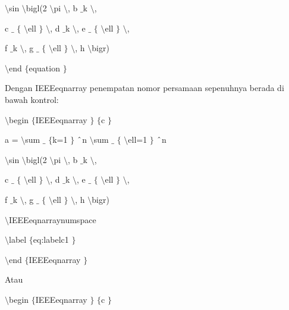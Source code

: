 \begin{itemize}
\vspace{12pt}
\noindent 
 $  \setminus  $sin  $  \setminus  $bigl(2 $  \setminus  $pi  $  \setminus  $, b $  \_  $k  $  \setminus  $, \par
\vspace{12pt}
\noindent 
c $  \_  $ $  \{  $ $  \setminus  $ell $  \}  $  $  \setminus  $, d $  \_  $k  $  \setminus  $, e $  \_  $ $  \{  $ $  \setminus  $ell $  \}  $  $  \setminus  $, \par
\vspace{12pt}
\noindent 
f $  \_  $k  $  \setminus  $, g $  \_  $ $  \{  $ $  \setminus  $ell $  \}  $  $  \setminus  $, h  $  \setminus  $bigr) \par
\vspace{12pt}
\noindent 
 $  \setminus  $end $  \{  $equation $  \}  $ \par
\vspace{12pt}
\noindent 
Dengan IEEEeqnarray penempatan nomor persamaan sepenuhnya berada di bawah kontrol: \par
\vspace{12pt}
\noindent 
 $  \setminus  $begin $  \{  $IEEEeqnarray $  \}  $ $  \{  $c $  \}  $ \par
\noindent 
a =  $  \setminus  $sum $  \_  $ $  \{  $k=1 $  \}  $ $  \string^  $n $  \setminus  $sum $  \_  $ $  \{  $ $  \setminus  $ell=1 $  \}  $ $  \string^  $n \par
\noindent 
 $  \setminus  $sin  $  \setminus  $bigl(2 $  \setminus  $pi  $  \setminus  $, b $  \_  $k  $  \setminus  $, \par
\noindent 
c $  \_  $ $  \{  $ $  \setminus  $ell $  \}  $  $  \setminus  $, d $  \_  $k  $  \setminus  $, e $  \_  $ $  \{  $ $  \setminus  $ell $  \}  $  $  \setminus  $, \par
\noindent 
f $  \_  $k  $  \setminus  $, g $  \_  $ $  \{  $ $  \setminus  $ell $  \}  $  $  \setminus  $, h  $  \setminus  $bigr) \par
\noindent 
 $  \setminus  $IEEEeqnarraynumspace \par
\noindent 
 $  \setminus  $label $  \{  $eq:labelc1 $  \}  $ \par
\noindent 
 $  \setminus  $end $  \{  $IEEEeqnarray $  \}  $ \par
\noindent 
\vspace{12pt}
\noindent 
\vspace{12pt}
\noindent 
Atau \par
\noindent 
\vspace{12pt}
\noindent 
 $  \setminus  $begin $  \{  $IEEEeqnarray $  \}  $ $  \{  $c $  \}  $ \par

\end{itemize}
